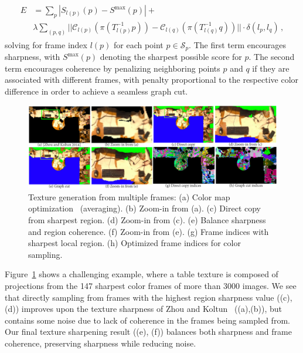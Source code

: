 \begin{align}
\begin{split}
E&=\sum_{p} |S_{l(p)}(p) - S^{\textrm{max}}(p)| + \\
&\lambda \sum_{(p,q)}||\mathcal{C}_{l(p)}(\pi(T^{-1}_{l(p)}p)) - \mathcal{C}_{l(q)}(\pi(T^{-1}_{l(q)}q))||\cdot \delta(l_p,l_q)\,,
\end{split}
\label{eq:3dlite-sharp-graph-cut}
\end{align}
solving for frame index $l(p)$ for each point $p\in\mathcal{S}_p$.
The first term encourages sharpness, with $S^{\textrm{max}}(p)$ denoting the sharpest possible score for $p$.
The second term encourages coherence by penalizing neighboring points $p$ and $q$ if they are associated with different frames, with penalty proportional to the respective color difference in order to achieve a seamless graph cut.
\begin{figure}
\centering
\includegraphics[width=\linewidth]{3dlite/fig5.png}
\caption{Texture generation from multiple frames: (a) Color map optimization~\cite{zhou2014color} (averaging). (b) Zoom-in from (a). (c) Direct copy from sharpest region. (d) Zoom-in from (c). (e) Balance sharpness and region coherence. (f) Zoom-in from (e). (g) Frame indices with sharpest local region. (h) Optimized frame indices for color sampling.
}
\label{fig:3dlite-sharp-graph-cut}
\end{figure}

Figure~\ref{fig:3dlite-sharp-graph-cut} shows a challenging example, where a table texture is composed of projections from the 147 sharpest color frames of more than 3000 images.
We see that directly sampling from frames with the highest region sharpness value ((c),(d)) improves upon the texture sharpness of Zhou and Koltun~\cite{zhou2014color} ((a),(b)), but contains some noise due to lack of coherence in the frames being sampled from. Our final texture sharpening result ((e), (f)) balances both sharpness and frame coherence, preserving sharpness while reducing noise.

